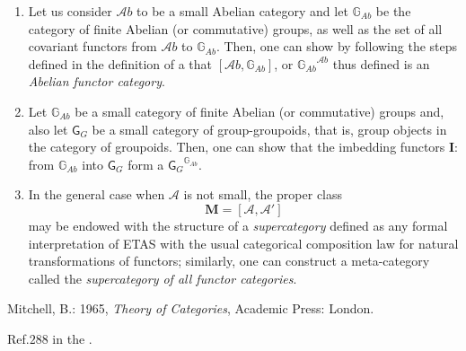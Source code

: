 \documentclass[12pt]{article}
\theoremstyle{plain}
\theoremstyle{definition}
\numberwithin{equation}{section}
\newcommand{\A}{\mathcal A}
\newcommand{\grp}{{\mathsf{G}}}
\begin{document}
\begin{enumerate}
\item Let us consider $\mathcal{A}b$ to be a small Abelian category and let $\mathbb{G}_{Ab}$ be the category of finite Abelian (or commutative) groups, as well as the set of all covariant functors from $\mathcal{A}b$ to 
$\mathbb{G}_{Ab}$. Then, one can show by following the steps defined in the definition of a 
 that $[\mathcal{A}b,\mathbb{G}_{Ab}]$, or 
${\mathbb{G}_{Ab}}^{\mathcal{A}b}$ thus defined is an \emph{Abelian functor category}. 

\item Let $\mathbb{G}_{Ab}$ be a small category of finite Abelian (or commutative) groups and, also let $\grp_G$ be a small category of group-groupoids, that is, group objects in the category of groupoids. Then, one can show that the imbedding functors  
$\textbf{I}$: from $\mathbb{G}_{Ab}$ into $\grp_G$ form a  
${\grp_G}^{\mathbb{G}_{Ab}}$.

\item In the general case when $\mathcal{\A}$ is not small, the proper class 
$$\textbf{M} = [\mathcal{\A}, \mathcal{\A'}]$$ may be endowed with the structure of a {\em supercategory} defined as any formal interpretation of ETAS with the usual categorical composition law for natural transformations of functors; similarly, one can construct a meta-category called the \emph{supercategory of all functor categories}.
\end{enumerate}



\begin{thebibliography}{9}

Mitchell, B.: 1965, \emph{Theory of Categories}, Academic Press: London.

Ref.$288$ in the 
.
 
\end{thebibliography}

\end{document}
